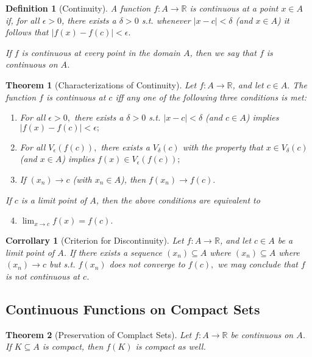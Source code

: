 \documentclass[10pt]{article}
\newtheorem{theorem}{Theorem}[section]
\newtheorem{definition}{Definition}[section]
\newtheorem{corollary}{Corrollary}[section]
\begin{document}
\begin{definition}[Continuity]
    A function $f:A\to\mathbb{R}$ is continuous at a point $x\in A$ if, for all $\epsilon >0$, there exists a $\delta>0$ s.t. whenever $|x-c|<\delta$ (and $x\in A$) it follows that $|f(x)-f(c)|<\epsilon.$

    If $f$ is continuous at every point in the domain $A$, then we say that $f$ is continuous on $A$.
\end{definition}

\begin{theorem}[Characterizations of Continuity]
    Let $f:A\to\mathbb{R}$, and let $c\in A.$ The function $f$ is continuous at $c$ iff any one of the following three conditions is met:
    \begin{enumerate}
        \item For all $\epsilon > 0,$ there exists a $\delta>0$ s.t. $|x-c|<\delta$ (and $c\in A$) implies $|f(x)-f(c)|<\epsilon;$
        \item For all $V_\epsilon(f(c)),$ there exists a $V_\delta(c)$ with the property that $x\in V_\delta(c)$ (and $x\in A$) implies $f(x)\in V_\epsilon(f(c));$
        \item If $(x_n)\to c$ (with $x_n\in A$), then $f(x_n)\to f(c).$
    \end{enumerate}
    If $c$ is a limit point of $A$, then the above conditions are equivalent to
    \begin{enumerate}
        \setcounter{enumi}{3}
        \item $\lim_{x\to c}f(x)=f(c).$
    \end{enumerate}
\end{theorem}

\begin{corollary}[Criterion for Discontinuity]
    Let $f:A\to\mathbb{R}$, and let $c\in A$ be a limit point of $A$. If there exists a sequence $(x_n)\subseteq A$ where $(x_n)\subseteq A$ where $(x_n)\to c$ but s.t. $f(x_n)$ does not converge to $f(c),$ we may conclude that $f$ is not continuous at $c$.
\end{corollary}

\subsection{Continuous Functions on Compact Sets}

\begin{theorem}[Preservation of Complact Sets]
    Let $f:A\to\mathbb{R}$ be continuous on $A$. If $K\subseteq A$ is compact, then $f(K)$ is compact as well.
\end{theorem}
\end{document}
